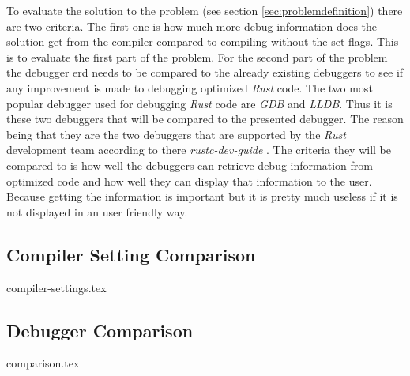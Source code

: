 

To evaluate the solution to the problem (see section \ref{sec:problemdefinition}) there are two criteria.
The first one is how much more debug information does the solution get from the compiler compared to compiling without the set flags.
This is to evaluate the first part of the problem.
For the second part of the problem the debugger \gls{erd} needs to be compared to the already existing debuggers to see if any improvement is made to debugging optimized \emph{Rust} code.
The two most popular debugger used for debugging \emph{Rust} code are \emph{GDB} and \emph{LLDB}.
Thus it is these two debuggers that will be compared to the presented debugger.
The reason being that they are the two debuggers that are supported by the \emph{Rust} development team according to there \emph{rustc-dev-guide} \cite{rust-dev-guide}.
The criteria they will be compared to is how well the debuggers can retrieve debug information from optimized code and how well they can display that information to the user.
Because getting the information is important but it is pretty much useless if it is not displayed in an user friendly way.


\subsection{Compiler Setting Comparison}
\label{sec:settingscomparison}
{compiler-settings.tex}


\subsection{Debugger Comparison}
\label{sec:debuggercomparison}
{comparison.tex}

